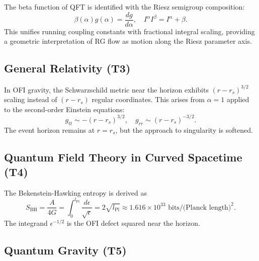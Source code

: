 \documentclass[12pt,a4paper]{article}
\theoremstyle{definition}
\newcommand{\Ialpha}{I^{\alpha}}
\newcommand{\Ibeta}{I^{\beta}}
\begin{document}
\begin{tcolorbox}[colback=blue!10,colframe=blue!75!black,title=T2 Highlight: Renormalization Group = Riesz Semigroup]
The beta function of QFT is identified with the Riesz semigroup composition:
\begin{equation}
\beta(\alpha) g(\alpha) = \frac{dg}{d\alpha}, \quad \Ialpha \Ibeta = \Ialpha+\beta.
\end{equation}
This unifies running coupling constants with fractional integral scaling, providing a geometric interpretation of RG flow as motion along the Riesz parameter axis.
\end{tcolorbox}

\subsection{General Relativity (T3)}

\begin{tcolorbox}[colback=blue!10,colframe=blue!75!black,title=T3 Highlight: Schwarzschild Horizon Scaling]
In OFI gravity, the Schwarzschild metric near the horizon exhibits $(r - r_s)^{3/2}$ scaling instead of $(r - r_s)$ regular coordinates. This arises from $\alpha = 1$ applied to the second-order Einstein equations:
\begin{equation}
g_{tt} \sim -(r - r_s)^{3/2}, \quad g_{rr} \sim (r - r_s)^{-3/2}.
\end{equation}
The event horizon remains at $r = r_s$, but the approach to singularity is softened.
\end{tcolorbox}

\subsection{Quantum Field Theory in Curved Spacetime (T4)}

\begin{tcolorbox}[colback=blue!10,colframe=blue!75!black,title=T4 Highlight: Black Hole Entropy from Defect Integral]
The Bekenstein-Hawking entropy is derived as
\begin{equation}
S_{\text{BH}} = \frac{A}{4G} = \int_0^{l_{\text{Pl}}} \frac{d\epsilon}{\sqrt{\epsilon}} = 2\sqrt{l_{\text{Pl}}} \approx 1.616 \times 10^{33} \text{ bits/(Planck length)}^2.
\end{equation}
The integrand $\epsilon^{-1/2}$ is the OFI defect squared near the horizon.
\end{tcolorbox}

\subsection{Quantum Gravity (T5)}
\end{document}
